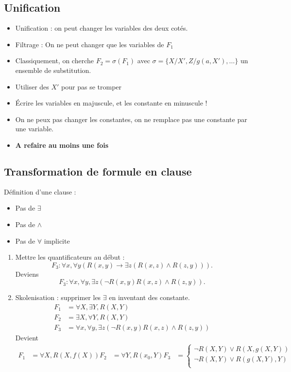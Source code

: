 \documentclass{article}
\theoremstyle{plain}%
\theoremstyle{definition}
\theoremstyle{remark}
\begin{document}
\subsection{Unification}
\begin{itemize}
    \item Unification : on peut changer les variables des deux cotés. 
    \item Filtrage : On ne peut changer que les variables de $ F_1 $ 
    \item Classiquement, on cherche $ F_2 = \sigma (F_1) $ avec $ \sigma = \{X/X', Z/g(a, X'), \dots \}$ un ensemble de substitution.
    \item Utiliser des $ X \prime  $ pour pas se tromper
    \item Écrire les variables en majuscule, et les constante en minuscule !
    \item On ne peux pas changer les constantes, on ne remplace pas une constante par une variable.
    \item \textbf{A refaire au moins une fois}
\end{itemize}

\subsection{Transformation de formule en clause}
Définition d'une clause : 
\begin{itemize}
    \item Pas de $ \exists  $ 
    \item Pas de $ \wedge  $ 
    \item Pas de $ \forall  $ implicite
\end{itemize}
\begin{enumerate}
    \item Mettre les quantificateurs au début : 
    \[
        F_3 : \forall x, \forall y (R(x,y) \to \exists z (R(x,z) \wedge R(z,y)))
    .\]
    Deviens 
    \[
        F_3 : \forall x, \forall y, \exists z (\neg R(x,y) R(x,z) \wedge R(z,y))
    .\]
    \item Skolenisation : supprimer les $ \exists  $ en inventant des constante. \begin{align*}
        F_1 &= \forall X, \exists Y, R(X,Y) \\
        F_2 &= \exists X, \forall Y, R(X,Y) \\
        F_3 &= \forall x, \forall y, \exists z (\neg R(x,y) R(x,z) \wedge R(z,y))
    \end{align*}
    Devient \begin{align*}
        F_1 &= \forall X, R(X, f(X))
        F_2 &= \forall Y, R(x_0, Y)
        F_3 &= \begin{cases}
        \neg R(X,Y) \vee R(X, g(X,Y)) \\
        \neg R(X,Y) \vee R(g(X,Y), Y) \\
        \end{cases} 
    \end{align*}
\end{enumerate}
\end{document}
